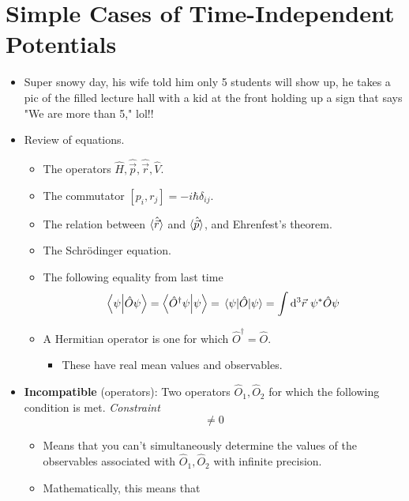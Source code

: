 \documentclass[../notes.tex]{subfiles}
\begin{document}
\section{Simple Cases of Time-Independent Potentials}
\begin{itemize}
    \item {}Super snowy day, his wife told him only 5 students will show up, he takes a pic of the filled lecture hall with a kid at the front holding up a sign that says "We are more than 5," lol!!
    \item Review of equations.
    \begin{itemize}
        \item The operators $\hat{H},\hat{\vec{p}},\hat{\vec{r}},\hat{V}$.
        \item The commutator $[p_i,r_j]=-i\hbar\delta_{ij}$.
        \item The relation between $\langle{\hat{\vec{r}}}\rangle$ and $\langle{\hat{\vec{p}}}\rangle$, and Ehrenfest's theorem.
        \item The Schr\"{o}dinger equation.
        \item The following equality from last time
        \begin{equation*}
            \braket{\psi}{\hat{O}\psi} = \braket{\hat{O}^\dagger\psi}{\psi}
            = \ev{\hat{O}}{\psi}
            = \int\dd^3\vec{r}\ \psi^*\hat{O}\psi
        \end{equation*}
        \item A Hermitian operator is one for which $\hat{O}^\dagger=\hat{O}$.
        \begin{itemize}
            \item These have real mean values and observables.
        \end{itemize}
    \end{itemize}
    \item \textbf{Incompatible} (operators): Two operators $\hat{O}_1,\hat{O}_2$ for which the following condition is met. \emph{Constraint}
    \begin{equation*}
        [\hat{O}_1,\hat{O}_2] \neq 0
    \end{equation*}
    \begin{itemize}
        \item Means that you can't simultaneously determine the values of the observables associated with $\hat{O}_1,\hat{O}_2$ with infinite precision.
        \item Mathematically, this means that
        \begin{equation*}

\end{equation*}
\end{itemize}
\end{itemize}
\end{document}
